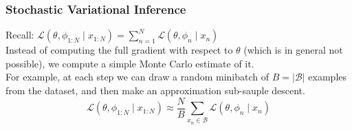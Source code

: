 \subsubsection{Stochastic Variational Inference}
Recall: $\mathcal{L}\left(\theta, \phi_{1: N} \mid x_{1: N}\right)=\sum_{n=1}^N \mathcal{L}\left(\theta, \phi_n \mid x_n\right)$\\
Instead of computing the full gradient with respect to $\theta$ (which is in general not possible), we compute a simple Monte Carlo estimate of it.\\
For example, at each step we can draw a random minibatch of $B=|\mathcal{B}|$ examples from the dataset, and then make an approximation sub-sauple descent.
$$
\mathcal{L}\left(\theta, \phi_{1: N} \mid x_{1: N}\right) \approx \frac{N}{B} \sum_{x_n \in \mathcal{B}} \mathcal{L}\left(\theta, \phi_n \mid x_n\right)
$$